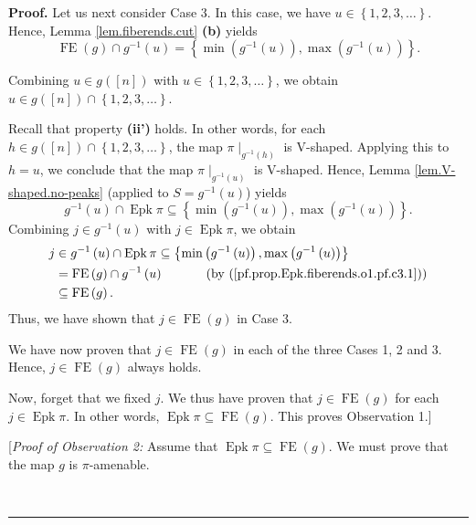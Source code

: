 \documentclass[numbers=enddot,12pt,final,onecolumn,notitlepage]{scrartcl}%
\theoremstyle{definition}
\newenvironment{proof}[1][Proof]{\noindent\textbf{#1.} }{\ \rule{0.5em}{0.5em}}
\newenvironment{verlong}{}{}
\begin{document}
\begin{verlong}
\begin{proof}
Let us next consider Case 3. In this case, we have $u\in\left\{
1,2,3,\ldots\right\}  $. Hence, Lemma \ref{lem.fiberends.cut} \textbf{(b)}
yields
\begin{equation}
\operatorname*{FE}\left(  g\right)  \cap g^{-1}\left(  u\right)  =\left\{
\min\left(  g^{-1}\left(  u\right)  \right)  ,\max\left(  g^{-1}\left(
u\right)  \right)  \right\}  . \label{pf.prop.Epk.fiberends.o1.pf.c3.1}%
\end{equation}


Combining $u\in g\left(  \left[  n\right]  \right)  $ with $u\in\left\{
1,2,3,\ldots\right\}  $, we obtain $u\in g\left(  \left[  n\right]  \right)
\cap\left\{  1,2,3,\ldots\right\}  $.

Recall that property \textbf{(ii')} holds. In other words, for each $h\in
g\left(  \left[  n\right]  \right)  \cap\left\{  1,2,3,\ldots\right\}  $, the
map $\pi\mid_{g^{-1}\left(  h\right)  }$ is V-shaped. Applying this to $h=u$,
we conclude that the map $\pi\mid_{g^{-1}\left(  u\right)  }$ is V-shaped.
Hence, Lemma \ref{lem.V-shaped.no-peaks} (applied to $S=g^{-1}\left(
u\right)  $) yields%
\[
g^{-1}\left(  u\right)  \cap\operatorname{Epk}\pi\subseteq\left\{
\min\left(  g^{-1}\left(  u\right)  \right)  ,\max\left(  g^{-1}\left(
u\right)  \right)  \right\}  .
\]
Combining $j\in g^{-1}\left(  u\right)  $ with $j\in\operatorname{Epk}\pi$,
we obtain%
\begin{align*}
j  &  \in g^{-1}\left(  u\right)  \cap\operatorname{Epk}\pi\subseteq\left\{
\min\left(  g^{-1}\left(  u\right)  \right)  ,\max\left(  g^{-1}\left(
u\right)  \right)  \right\} \\
&  =\operatorname*{FE}\left(  g\right)  \cap g^{-1}\left(  u\right)
\ \ \ \ \ \ \ \ \ \ \left(  \text{by (\ref{pf.prop.Epk.fiberends.o1.pf.c3.1}%
)}\right) \\
&  \subseteq\operatorname*{FE}\left(  g\right)  .
\end{align*}
Thus, we have shown that $j\in\operatorname*{FE}\left(  g\right)  $ in Case 3.

We have now proven that $j\in\operatorname*{FE}\left(  g\right)  $ in each of
the three Cases 1, 2 and 3. Hence, $j\in\operatorname*{FE}\left(  g\right)  $
always holds.

Now, forget that we fixed $j$. We thus have proven that $j\in
\operatorname*{FE}\left(  g\right)  $ for each $j\in\operatorname{Epk}\pi$.
In other words, $\operatorname{Epk}\pi\subseteq\operatorname*{FE}\left(
g\right)  $. This proves Observation 1.]

[\textit{Proof of Observation 2:} Assume that $\operatorname{Epk}\pi
\subseteq\operatorname*{FE}\left(  g\right)  $. We must prove that the map $g$
is $\pi$-amenable.


\end{proof}
\end{verlong}
\end{document}
